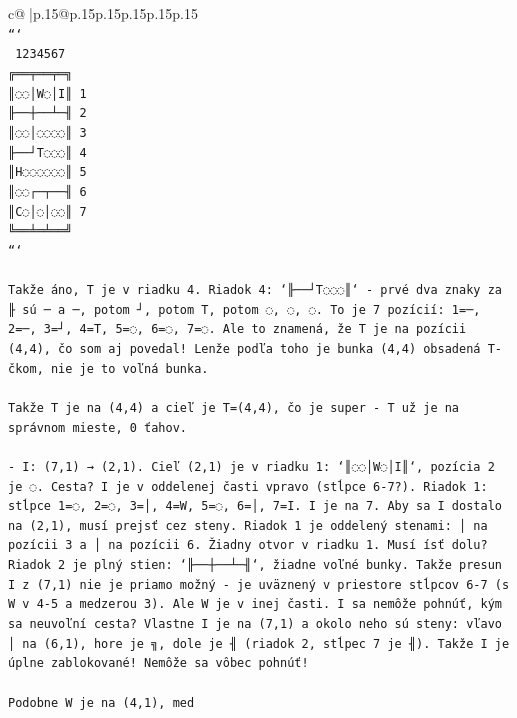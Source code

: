 \documentclass{article}
\begin{document}
{\begin{supertabular}{c@{$\;$}|p{.15\linewidth}@{}p{.15\linewidth}p{.15\linewidth}p{.15\linewidth}p{.15\linewidth}p{.15\linewidth}}
{{{\\ 
\texttt{```} \\
\texttt{ 1234567} \\
\texttt{╔══╤══╤═╗} \\
\texttt{║◌◌│W◌│I║ 1} \\
\texttt{╟──┼──┴─╢ 2} \\
\texttt{║◌◌│◌◌◌◌║ 3} \\
\texttt{╟──┘T◌◌◌║ 4} \\
\texttt{║H◌◌◌◌◌◌║ 5} \\
\texttt{║◌◌┌─┬──╢ 6} \\
\texttt{║C◌│◌│◌◌║ 7} \\
\texttt{╚══╧═╧══╝} \\
\texttt{```} \\
\\ 
\texttt{Takže áno, T je v riadku 4. Riadok 4: `╟──┘T◌◌◌║` {-} prvé dva znaky za ╟ sú ─ a ─, potom ┘, potom T, potom ◌, ◌, ◌. To je 7 pozícií: 1=─, 2=─, 3=┘, 4=T, 5=◌, 6=◌, 7=◌. Ale to znamená, že T je na pozícii (4,4), čo som aj povedal! Lenže podľa toho je bunka (4,4) obsadená T{-}čkom, nie je to voľná bunka.} \\
\\ 
\texttt{Takže T je na (4,4) a cieľ je T=(4,4), čo je super {-} T už je na správnom mieste, 0 ťahov.} \\
\\ 
\texttt{{-} I: (7,1) → (2,1). Cieľ (2,1) je v riadku 1: `║◌◌│W◌│I║`, pozícia 2 je ◌. Cesta? I je v oddelenej časti vpravo (stĺpce 6{-}7?). Riadok 1: stĺpce 1=◌, 2=◌, 3=│, 4=W, 5=◌, 6=│, 7=I. I je na 7. Aby sa I dostalo na (2,1), musí prejsť cez steny. Riadok 1 je oddelený stenami: │ na pozícii 3 a │ na pozícii 6. Žiadny otvor v riadku 1. Musí ísť dolu? Riadok 2 je plný stien: `╟──┼──┴─╢`, žiadne voľné bunky. Takže presun I z (7,1) nie je priamo možný {-} je uväznený v priestore stĺpcov 6{-}7 (s W v 4{-}5 a medzerou 3). Ale W je v inej časti. I sa nemôže pohnúť, kým sa neuvoľní cesta? Vlastne I je na (7,1) a okolo neho sú steny: vľavo │ na (6,1), hore je ╗, dole je ╢ (riadok 2, stĺpec 7 je ╢). Takže I je úplne zablokované! Nemôže sa vôbec pohnúť!} \\
\\ 
\texttt{Podobne W je na (4,1), med} \\
            }
        }
    }
     \\ \\


\end{supertabular}}
\end{document}
